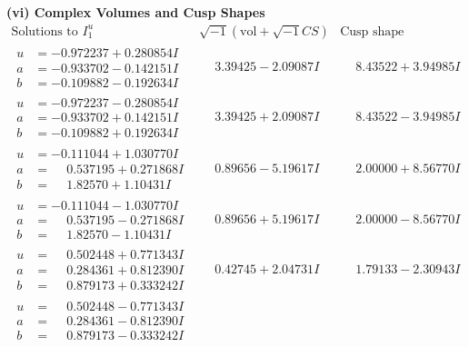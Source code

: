 \documentclass[1p]{elsarticle_modified}
\theoremstyle{definition}
\newcommand{\I}{\sqrt{-1}}
\begin{document}
\newpage\flushleft \textbf{(vi) Complex Volumes and Cusp Shapes}
$$\begin{array}{c|c|c}  
\text{Solutions to }I^u_{1}& \I (\text{vol} + \sqrt{-1}CS) & \text{Cusp shape}\\
 \hline 
\begin{aligned}
u &= -0.972237 + 0.280854 I \\
a &= -0.933702 - 0.142151 I \\
b &= -0.109882 - 0.192634 I\end{aligned}
 & \phantom{-}3.39425 - 2.09087 I & \phantom{-}8.43522 + 3.94985 I \\ \hline\begin{aligned}
u &= -0.972237 - 0.280854 I \\
a &= -0.933702 + 0.142151 I \\
b &= -0.109882 + 0.192634 I\end{aligned}
 & \phantom{-}3.39425 + 2.09087 I & \phantom{-}8.43522 - 3.94985 I \\ \hline\begin{aligned}
u &= -0.111044 + 1.030770 I \\
a &= \phantom{-}0.537195 + 0.271868 I \\
b &= \phantom{-}1.82570 + 1.10431 I\end{aligned}
 & \phantom{-}0.89656 - 5.19617 I & \phantom{-}2.00000 + 8.56770 I \\ \hline\begin{aligned}
u &= -0.111044 - 1.030770 I \\
a &= \phantom{-}0.537195 - 0.271868 I \\
b &= \phantom{-}1.82570 - 1.10431 I\end{aligned}
 & \phantom{-}0.89656 + 5.19617 I & \phantom{-}2.00000 - 8.56770 I \\ \hline\begin{aligned}
u &= \phantom{-}0.502448 + 0.771343 I \\
a &= \phantom{-}0.284361 + 0.812390 I \\
b &= \phantom{-}0.879173 + 0.333242 I\end{aligned}
 & \phantom{-}0.42745 + 2.04731 I & \phantom{-}1.79133 - 2.30943 I \\ \hline\begin{aligned}
u &= \phantom{-}0.502448 - 0.771343 I \\
a &= \phantom{-}0.284361 - 0.812390 I \\
b &= \phantom{-}0.879173 - 0.333242 I\end{aligned}

\end{array}$$
\end{document}
